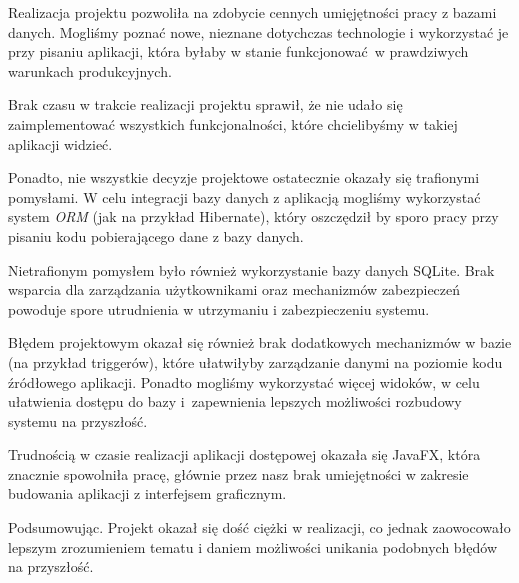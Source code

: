Realizacja projektu pozwoliła na zdobycie cennych umięjętności pracy z bazami danych. Mogliśmy poznać nowe, nieznane dotychczas technologie i wykorzystać je przy pisaniu aplikacji, która byłaby w stanie funkcjonować w prawdziwych warunkach produkcyjnych.

Brak czasu w trakcie realizacji projektu sprawił, że nie udało się zaimplementować wszystkich funkcjonalności, które chcielibyśmy w takiej aplikacji widzieć.

Ponadto, nie wszystkie decyzje projektowe ostatecznie okazały się trafionymi pomysłami. W celu integracji bazy danych z aplikacją mogliśmy wykorzystać system \emph{ORM} (jak na przykład Hibernate), który oszczędził by sporo pracy przy pisaniu kodu pobierającego dane z bazy danych.

Nietrafionym pomysłem było również wykorzystanie bazy danych SQLite. Brak wsparcia dla zarządzania użytkownikami oraz mechanizmów zabezpieczeń powoduje spore utrudnienia w utrzymaniu i zabezpieczeniu systemu.

Błędem projektowym okazał się również brak dodatkowych mechanizmów w bazie (na przykład triggerów), które ułatwiłyby zarządzanie danymi na poziomie kodu źródłowego aplikacji. Ponadto mogliśmy wykorzystać więcej widoków, w celu ułatwienia dostępu do bazy i~zapewnienia lepszych możliwości rozbudowy systemu na przyszłość.

Trudnością w czasie realizacji aplikacji dostępowej okazała się JavaFX, która znacznie spowolniła pracę, głównie przez nasz brak umiejętności w zakresie budowania aplikacji z interfejsem graficznym.

Podsumowując. Projekt okazał się dość ciężki w realizacji, co jednak zaowocowało lepszym zrozumieniem tematu i daniem możliwości unikania podobnych błędów na przyszłość.


